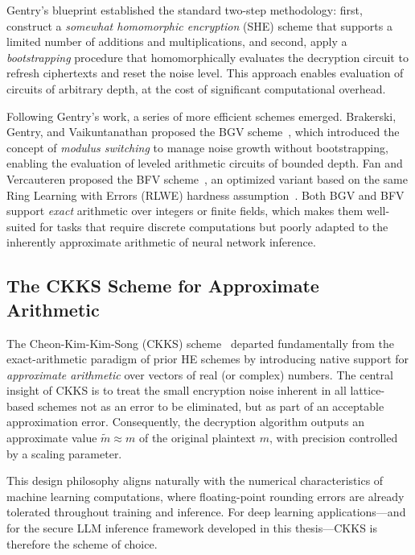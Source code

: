 Gentry's blueprint established the standard two-step methodology: first, construct a \emph{somewhat homomorphic encryption} (SHE) scheme that supports a limited number of additions and multiplications, and second, apply a \emph{bootstrapping} procedure that homomorphically evaluates the decryption circuit to refresh ciphertexts and reset the noise level. This approach enables evaluation of circuits of arbitrary depth, at the cost of significant computational overhead.

Following Gentry's work, a series of more efficient schemes emerged. Brakerski, Gentry, and Vaikuntanathan proposed the BGV scheme~\cite{brakerski2012leveled}, which introduced the concept of \emph{modulus switching} to manage noise growth without bootstrapping, enabling the evaluation of leveled arithmetic circuits of bounded depth. Fan and Vercauteren proposed the BFV scheme~\cite{fan2012somewhat}, an optimized variant based on the same Ring Learning with Errors (RLWE) hardness assumption~\cite{lyubashevsky2010ideal}. Both BGV and BFV support \emph{exact} arithmetic over integers or finite fields, which makes them well-suited for tasks that require discrete computations but poorly adapted to the inherently approximate arithmetic of neural network inference.

\subsection{The CKKS Scheme for Approximate Arithmetic}

The Cheon-Kim-Kim-Song (CKKS) scheme~\cite{cheon2017homomorphic} departed fundamentally from the exact-arithmetic paradigm of prior HE schemes by introducing native support for \emph{approximate arithmetic} over vectors of real (or complex) numbers. The central insight of CKKS is to treat the small encryption noise inherent in all lattice-based schemes not as an error to be eliminated, but as part of an acceptable approximation error. Consequently, the decryption algorithm outputs an approximate value $\tilde{m} \approx m$ of the original plaintext $m$, with precision controlled by a scaling parameter.

This design philosophy aligns naturally with the numerical characteristics of machine learning computations, where floating-point rounding errors are already tolerated throughout training and inference. For deep learning applications---and for the secure LLM inference framework developed in this thesis---CKKS is therefore the scheme of choice.


